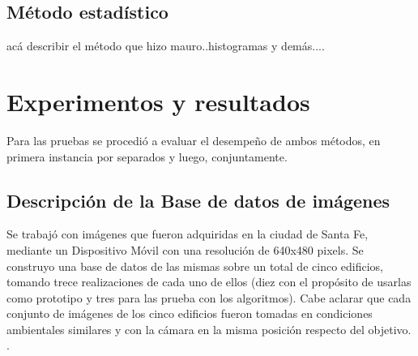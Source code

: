 \documentclass[conference,spanish,a4paper,10pt,oneside,final]{tfmpd}
\begin{document}
\subsection*{Método estadístico}
acá describir el método que hizo mauro..histogramas y demás....
%
%
%
%
\section{Experimentos y resultados}
Para las pruebas se procedió a evaluar el desempeño de ambos métodos, en primera instancia por separados y luego, conjuntamente.
\subsection{Descripción de la Base de datos de imágenes}
Se trabajó con imágenes que fueron adquiridas en la ciudad de Santa Fe, mediante un Dispositivo Móvil con una resolución de 640x480 pixels. Se construyo una base de datos de las mismas sobre un total de cinco edificios, tomando trece realizaciones de cada uno de ellos (diez con el propósito de usarlas como prototipo y tres para las prueba con los algoritmos). Cabe aclarar que cada conjunto de imágenes de los cinco edificios fueron tomadas en condiciones ambientales similares y con la cámara en la misma posición respecto del objetivo. .
%
%
\end{document}
